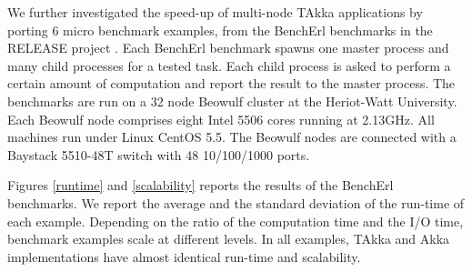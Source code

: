 We further investigated the speed-up of multi-node TAkka applications by 
porting 6 micro benchmark examples, from the BenchErl benchmarks in the RELEASE 
project \citep{RELEASE}.  Each BenchErl benchmark spawns one master process and 
many child processes for a tested task.  Each child process is asked to perform 
a certain amount of computation and report the result to the master process.  
The benchmarks are run on a 32 node Beowulf cluster at the Heriot-Watt 
University. Each Beowulf node comprises eight Intel 5506 cores running at
2.13GHz. All machines run under Linux CentOS 5.5. The Beowulf nodes are
connected with a Baystack 5510-48T switch with 48 10/100/1000 ports.

Figures \ref{runtime} and \ref{scalability} reports the results of the BenchErl 
benchmarks.   We report the average and the standard deviation 
of the run-time of each example.  Depending on the ratio of the computation 
time and the I/O time, benchmark examples scale at different levels.  In 
all examples, TAkka and Akka implementations have almost identical 
run-time and scalability.


